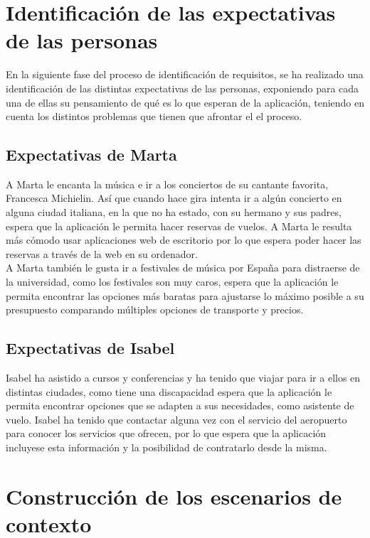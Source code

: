\section{Identificación de las expectativas de las personas}
En la siguiente fase del proceso de identificación  de requisitos, se ha realizado una identificación de las distintas expectativas de las personas, exponiendo para cada una 
de ellas su pensamiento de qué es lo que esperan de la aplicación, teniendo en cuenta los distintos problemas que tienen que afrontar el el proceso.

\subsection{Expectativas de Marta}
A Marta le encanta la música e ir a los conciertos de su cantante favorita, Francesca Michielin. Así que cuando hace gira intenta ir a algún concierto en alguna 
ciudad italiana, en la que no ha estado, con su hermano y sus padres, espera que la aplicación le permita hacer reservas de vuelos. A Marta le resulta más cómodo 
usar aplicaciones web de escritorio por lo que espera poder hacer las reservas a través de la web en su ordenador. \\

A Marta también le gusta ir a festivales de música por España para distraerse de la universidad, como los festivales son muy caros, espera que la aplicación 
le permita encontrar las opciones más baratas para ajustarse lo máximo posible a su presupuesto comparando múltiples opciones de transporte y precios.


\subsection{Expectativas de Isabel}
Isabel ha asistido a cursos y conferencias y ha tenido que viajar para ir a ellos en distintas ciudades, como tiene una discapacidad espera que la aplicación 
le permita encontrar opciones que se adapten a sus necesidades, como asistente de vuelo. Isabel ha tenido que contactar alguna vez con el servicio del 
aeropuerto para conocer los servicios que ofrecen, por lo que espera que la aplicación incluyese esta información y la posibilidad de contratarlo desde la misma.

\section{Construcción de los escenarios de contexto}
